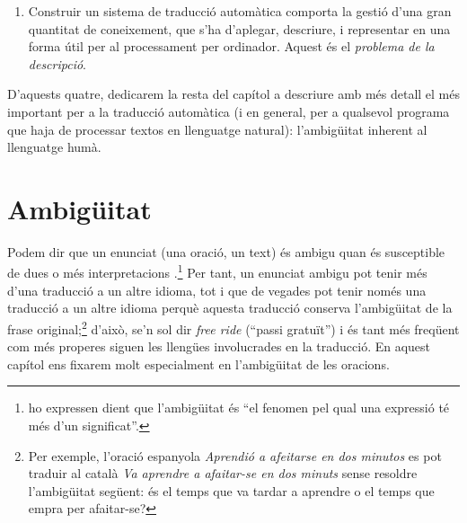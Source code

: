\begin{enumerate}
\item Construir un sistema de traducció automàtica comporta la gestió
  d'una gran quantitat de coneixement, que s'ha d'aplegar, descriure,
  i representar en una forma útil per al processament per
  ordinador. Aquest és el \emph{problema de la descripció}.
\end{enumerate}

D'aquests quatre, dedicarem la resta del capítol a descriure amb més
detall el més important per a la traducció automàtica (i en general,
per a qualsevol programa que haja de processar textos en llenguatge
natural): l'ambigüitat inherent al llenguatge humà.

\section{Ambigüitat}

Podem dir que un enunciat (una oració, un text) és ambigu quan és
susceptible de dues o més interpretacions
\citep{alcaraz97b}.\footnote{\citet{don96u} ho expressen dient que
  l'ambigüitat és ``el fenomen pel qual una expressió té més d'un
  significat''.} Per tant, un enunciat ambigu pot tenir més d'una
traducció a un altre idioma, tot i que de vegades pot tenir només una
traducció a un altre idioma perquè aquesta traducció conserva
l'ambigüitat de la frase original;\footnote{Per exemple, l'oració
  espanyola \emph{Aprendió a afeitarse en dos minutos} es pot traduir
  al català \emph{Va aprendre a afaitar-se en dos minuts} sense
  resoldre l'ambigüitat següent: és el temps que va tardar a aprendre
  o el temps que empra per afaitar-se?}  d'això, se'n sol dir
\emph{free ride} (``passi gratuït'') i és tant més freqüent com més
properes siguen les llengües involucrades en la traducció. En aquest
capítol ens fixarem molt especialment en l'ambigüitat de les oracions.

